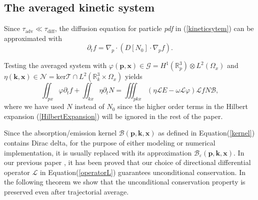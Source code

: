 \documentclass{article}
\numberwithin{equation}{section}
\begin{document}
\subsection{The averaged kinetic system}  

Since $\tau_\text{adv} \ll \tau_\text{diff}$, the diffusion equation for particle \textit{pdf} in (\ref{kineticsytem}) can be approximated with
\begin{equation*}
    \partial_{t}f=\nabla_{p}\cdot(D[N_{0}]\cdot\nabla_{p}f).
\end{equation*}

Testing the averaged system with $\varphi(\mathbf{p}, \mathbf{x}) \in \mathcal{G} = H^{1}(\mathbb{R}^{3}_{p})\otimes L^2(\Omega_{x})$ and $\eta(\mathbf{k}, \mathbf{x}) \in \mathcal{N}= \text{ker}\mathcal{T} \cap L^{2}(\mathbb{R}^{3}_{k}\times\Omega_{x})$ yields
\begin{equation}\label{aversys}
    \iint_{px}\varphi\partial_{t}f+\iint_{kx}\eta\partial_{t}N=\iiint_{pkx}\left(\eta\mathcal{L}E-\omega\mathcal{L}\varphi\right)\mathcal{L}fN\mathcal{B},
\end{equation}
where we have used $N$ instead of $N_{0}$ since the higher order terms in the Hilbert expansion (\ref{HilbertExpansion}) will be ignored in the rest of the paper.

\bigskip
Since the absorption/emission kernel $\mathcal{B}(\mathbf{p}, \mathbf{k}, \mathbf{x})$ as defined in Equation(\ref{kernel}) contains Dirac delta, for the purpose of either modeling or numerical implementation, it is
usually replaced with its approximation $\mathcal{B}_{\varepsilon}(\mathbf{p},\mathbf{k}, \mathbf{x})$. In our previous paper \cite{huang2023conservative}, it has been proved that our choice of directional differential operator $\mathcal{L}$ in Equation(\ref{operatorL}) guarantees unconditional conservation. In the following theorem we show that the unconditional conservation property is preserved even after trajectorial average.
\end{document}
